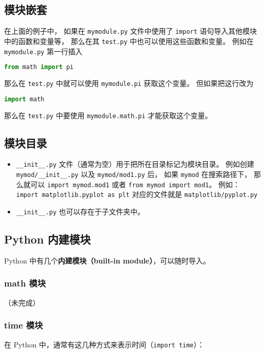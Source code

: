 \subsection{模块嵌套}
在上面的例子中， 如果在 \verb|mymodule.py| 文件中使用了 \verb|import| 语句导入其他模块中的函数和变量等， 那么在其 \verb|test.py| 中也可以使用这些函数和变量。 例如在 \verb|mymodule.py| 第一行插入
\begin{lstlisting}[language=python]
from math import pi
\end{lstlisting}
那么在 \verb|test.py| 中就可以使用 \verb|mymodule.pi| 获取这个变量。 但如果把这行改为
\begin{lstlisting}[language=python]
import math
\end{lstlisting}
那么在 \verb|test.py| 中要使用 \verb|mymodule.math.pi| 才能获取这个变量。

\subsection{模块目录}
\begin{itemize}
\item \verb|__init__.py| 文件（通常为空）用于把所在目录标记为模块目录。 例如创建 \verb|mymod/__init__.py| 以及 \verb|mymod/mod1.py| 后， 如果 \verb|mymod| 在搜索路径下， 那么就可以 \verb|import mymod.mod1| 或者 \verb|from mymod import mod1|。 例如： \verb|import matplotlib.pyplot as plt| 对应的文件就是 \verb|matplotlib/pyplot.py|
\item \verb|__init__.py| 也可以存在于子文件夹中。
\end{itemize}


\subsection{Python 内建模块}
Python 中有几个\textbf{内建模块（built-in module）}，可以随时导入。

\subsubsection{math 模块}
（未完成）

\subsubsection{time 模块}
在 Python 中，通常有这几种方式来表示时间（\verb|import time|）：

